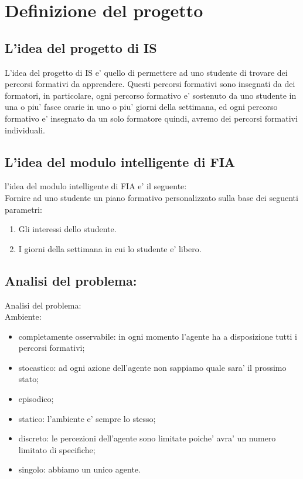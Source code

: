 \documentclass[10pt,a4paper]{article}
\begin{document}
  
  \tableofcontents
  
  \section{Definizione del progetto}
    \label{definizioneDelProgettoSection}
    
    \subsection{L'idea del progetto di IS}
      \label{ideaDelProgettoDiISSubsection}
        L'idea del progetto di IS e' quello di permettere ad uno studente di trovare dei 
        percorsi formativi da apprendere. Questi percorsi formativi sono insegnati da dei 
        formatori, in particolare, ogni percorso formativo e' sostenuto da uno studente in 
        una o piu' fasce orarie in uno o piu' giorni della settimana, ed ogni percorso 
        formativo e' insegnato da un solo formatore quindi, avremo dei percorsi formativi 
        individuali.
        
    \subsection{L'idea del modulo intelligente di FIA}
      \label{ideaDelModuloIntelligenteDiFIASubsection}
        l'idea del modulo intelligente di FIA e' il seguente:\\
        Fornire ad uno studente un piano formativo personalizzato sulla base dei seguenti 
        parametri:\\
        \begin{enumerate}
          \item Gli interessi dello studente.
          \item I giorni della settimana in cui lo studente e' libero.
        \end{enumerate}
        
    \subsection{Analisi del problema:}
      \label{analisiDelProblemaSubsection}
        Analisi del problema:\\
        Ambiente:
        \begin{itemize}
          \item completamente osservabile: in ogni momento l'agente ha a disposizione tutti i percorsi formativi;
          \item stocastico: ad ogni azione dell'agente non sappiamo quale sara' il prossimo stato;
          \item episodico;
          \item statico: l'ambiente e' sempre lo stesso;
          \item discreto: le percezioni dell'agente sono limitate poiche' avra' un numero limitato di specifiche;
          \item singolo: abbiamo un unico agente.
        \end{itemize}
        
\end{document}
